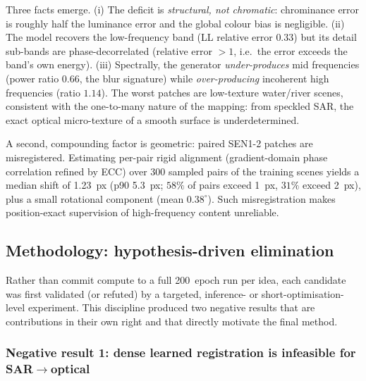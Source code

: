 Three facts emerge. (i) The deficit is \emph{structural, not chromatic}: chrominance error is
roughly half the luminance error and the global colour bias is negligible. (ii) The model
recovers the low-frequency band (LL relative error $0.33$) but its detail sub-bands are
phase-decorrelated (relative error $>1$, i.e.\ the error exceeds the band's own energy). (iii)
Spectrally, the generator \emph{under-produces} mid frequencies (power ratio $0.66$, the blur
signature) while \emph{over-producing} incoherent high frequencies (ratio $1.14$). The worst
patches are low-texture water/river scenes, consistent with the one-to-many nature of the
mapping: from speckled SAR, the exact optical micro-texture of a smooth surface is
underdetermined.

A second, compounding factor is geometric: paired SEN1-2 patches are misregistered. Estimating
per-pair rigid alignment (gradient-domain phase correlation refined by ECC) over \num{300}
sampled pairs of the training scenes yields a median shift of \SI{1.23}{px} (p90
\SI{5.3}{px}; $58\%$ of pairs exceed \SI{1}{px}, $31\%$ exceed \SI{2}{px}), plus a small
rotational component (mean $0.38^\circ$). Such misregistration makes position-exact
supervision of high-frequency content unreliable.

\subsection{Methodology: hypothesis-driven elimination}
\label{sec:hfd:method}

Rather than commit compute to a full \SI{200}{epoch} run per idea, each candidate was first
validated (or refuted) by a targeted, inference- or short-optimisation-level experiment. This
discipline produced two negative results that are contributions in their own right and that
directly motivate the final method.

\subsubsection{Negative result 1: dense learned registration is infeasible for SAR$\to$optical}
\label{sec:hfd:neg1}

